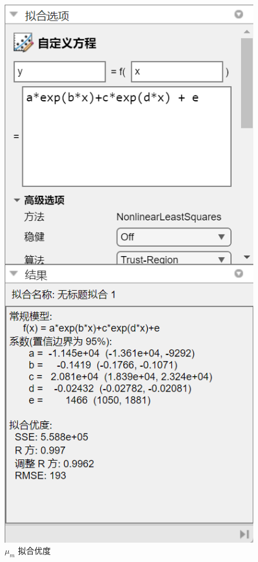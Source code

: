 \documentclass[UTF8]{article}
\theoremstyle{MyLineTheoremStyle} %
\theoremstyle{MyBlockTheoremStyle} %
\theoremstyle{MySubsubsectionStyle} %
\begin{document}
\begin{center}
\begin{minipage}{0.28\columnwidth}
\begin{figure}[H]
\includegraphics[width=\columnwidth]{assets/1.2/fd7e40fc533d62dd25043cc43de0afe8.png}
\caption{$\mu_m$ 拟合优度}\label{1.2拟合优度}
\end{figure}
\end{minipage}
\end{center}
\end{document}
